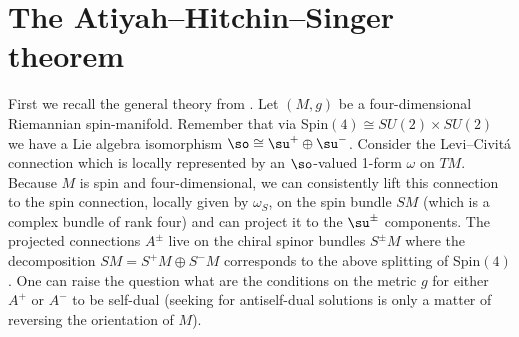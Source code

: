 \documentclass[a4paper,12pt,draft]{article}
\begin{document}
\section{The Atiyah--Hitchin--Singer theorem}

First we recall the general theory from \cite{boo-ble}.
Let $(M,g)$ be a four-dimensional Riemannian spin-manifold. Remember that
via Spin$(4)\cong SU(2)\times SU(2)$ we have a Lie algebra isomorphism
$\so\cong\su^+\oplus\su^-$. Consider the Levi--Civit\'a connection
which is locally represented by an $\so$-valued 1-form $\omega$ on
$TM$. Because $M$ is spin and four-dimensional, we can consistently lift
this connection to the spin connection, locally given by $\omega_S$, on
the spin bundle $SM$ (which is a complex bundle of rank four) and can
project it to the $\su^\pm$ components. The projected connections $A^\pm$
live on the chiral spinor bundles $S^\pm M$ where the decomposition
$SM=S^+M\oplus S^-M$ corresponds to the above splitting of Spin$(4)$. One
can raise the question what are the conditions on the metric $g$ for
either $A^+$ or $A^-$ to be self-dual (seeking for antiself-dual solutions
is only a matter of reversing the orientation of $M$).
\end{document}
